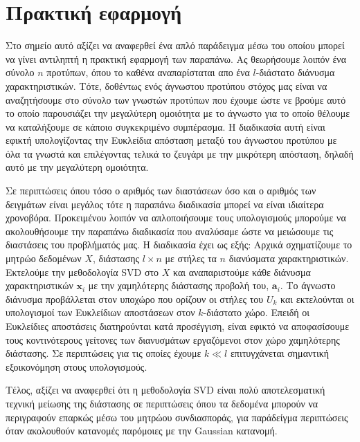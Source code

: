 \section{Πρακτική εφαρμογή}
\par
Στο σημείο αυτό αξίζει να αναφερθεί ένα απλό παράδειγμα μέσω του οποίου μπορεί να γίνει αντιληπτή η πρακτική εφαρμογή των παραπάνω. Ας θεωρήσουμε λοιπόν ένα σύνολο $n$ προτύπων, όπου το καθένα αναπαρίσταται απο ένα $l$-διάστατο διάνυσμα χαρακτηριστικών. Τότε, δοθέντως ενός άγνωστου προτύπου στόχος μας είναι να αναζητήσουμε στο σύνολο των γνωστών προτύπων που έχουμε ώστε νε βρούμε αυτό το οποίο παρουσιάζει την μεγαλύτερη ομοιότητα με το άγνωστο για το οποίο θέλουμε να καταλήξουμε σε κάποιο συγκεκριμένο συμπέρασμα. Η διαδικασία αυτή είναι εφικτή υπολογίζοντας την Ευκλείδια απόσταση μεταξύ του άγνωστου προτύπου με όλα τα γνωστά και επιλέγοντας τελικά το ζευγάρι με την μικρότερη απόσταση, δηλαδή αυτό με την μεγαλύτερη ομοιότητα.
\par
Σε περιπτώσεις όπου τόσο ο αριθμός των διαστάσεων όσο και ο αριθμός των δειγμάτων είναι μεγάλος τότε η παραπάνω διαδικασία μπορεί να είναι ιδιαίτερα χρονοβόρα. Προκειμένου λοιπόν να απλοποιήσουμε τους υπολογισμούς μπορούμε να ακολουθήσουμε την παραπάνω διαδικασία που αναλύσαμε ώστε να μειώσουμε τις διαστάσεις του προβλήματός μας. Η διαδικασία έχει ως εξής: Αρχικά σχηματίζουμε το μητρώο δεδομένων $X$, διάστασης $ l \times n $ με στήλες τα $n$ διανύσματα χαρακτηριστικών. Εκτελούμε την μεθοδολογία \textlatin{SVD} στο $X$ και αναπαριστούμε κάθε διάνυσμα χαρακτηριστικών $ \mathbf{x}_{i} $ με την χαμηλότερης διάστασης προβολή του, $ \mathbf{a}_{i} $. Το άγνωστο διάνυσμα προβάλλεται στον υποχώρο που ορίζουν οι στήλες του $U_{k}$ και εκτελούνται οι υπολογισμοί των Ευκλείδιων αποστάσεων στον $k$-διάστατο χώρο. Επειδή οι Ευκλείδιες αποστάσεις διατηρούνται κατά προσέγγιση, είναι εφικτό να αποφασίσουμε τους κοντινότερους γείτονες των διανυσμάτων εργαζόμενοι στον χώρο χαμηλότερης διάστασης. Σε περιπτώσεις για τις οποίες έχουμε $k \ll l$ επιτυγχάνεται σημαντική εξοικονόμηση στους υπολογισμούς.
\par
Τέλος, αξίζει να αναφερθεί ότι η μεθοδολογία \textlatin{SVD} είναι πολύ αποτελεσματική τεχνική μείωσης της διάστασης  σε περιπτώσεις όπου τα δεδομένα μπορούν να περιγραφούν επαρκώς μέσω του μητρώου συνδιασποράς, για παράδείγμα περιπτώσεις όταν ακολουθούν κατανομές παρόμοιες με την \textlatin{Gaussian} κατανομή.



